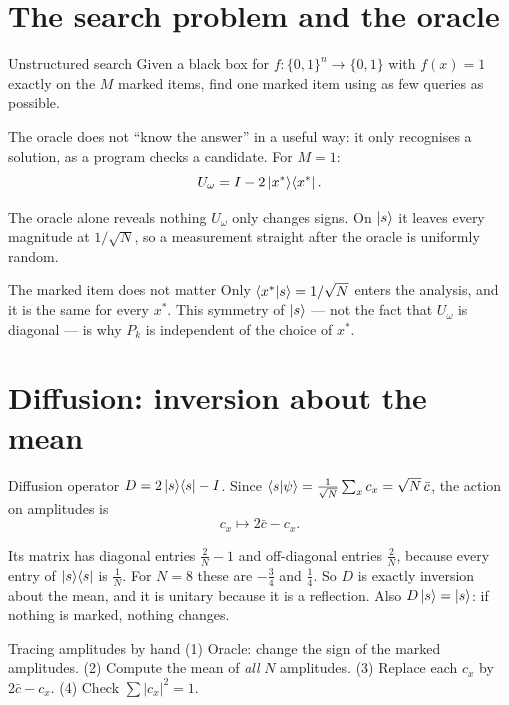 \documentclass[11pt,a4paper,openany]{book}
\newcommand{\xs}{x^\ast}
\newcommand{\proj}[1]{\ket{#1}\!\bra{#1}}
\begin{document}
\section{The search problem and the oracle}
\begin{defn}{Unstructured search}
Given a black box for $f: \{0,1\}^n \to \{0,1\}$ with $f(x) = 1$ exactly on the $M$ marked items, find one marked item using as few queries as possible.
\end{defn}
The oracle does not ``know the answer'' in a useful way: it only recognises a solution, as a program checks a candidate. For $M = 1$:
\[ U_\omega = I - 2\proj{\xs}. \]
\begin{keyres}{The oracle alone reveals nothing}
$U_\omega$ only changes signs. On $\ket{s}$ it leaves every magnitude at $1/\sqrt N$, so a measurement straight after the oracle is uniformly random.
\end{keyres}
\begin{keyres}{The marked item does not matter}
Only $\braket{\xs|s} = 1/\sqrt N$ enters the analysis, and it is the same for every $\xs$. This symmetry of $\ket{s}$ --- not the fact that $U_\omega$ is diagonal --- is why $P_k$ is independent of the choice of $\xs$.
\end{keyres}

\section{Diffusion: inversion about the mean}
\begin{defn}{Diffusion operator}
$D = 2\proj{s} - I$. Since $\braket{s|\psi} = \frac{1}{\sqrt N}\sum_x c_x = \sqrt N\,\bar c$, the action on amplitudes is
\[ c_x \longmapsto 2\bar c - c_x. \]
\end{defn}
Its matrix has diagonal entries $\frac2N - 1$ and off-diagonal entries $\frac2N$, because every entry of $\proj{s}$ is $\frac1N$. For $N = 8$ these are $-\frac34$ and $\frac14$.
So $D$ is exactly inversion about the mean, and it is unitary because it is a reflection. Also $D\ket{s} = \ket{s}$: if nothing is marked, nothing changes.

\begin{method}{Tracing amplitudes by hand}
(1) Oracle: change the sign of the marked amplitudes. (2) Compute the mean of \emph{all} $N$ amplitudes. (3) Replace each $c_x$ by $2\bar c - c_x$. (4) Check $\sum|c_x|^2 = 1$.
\end{method}
\end{document}
